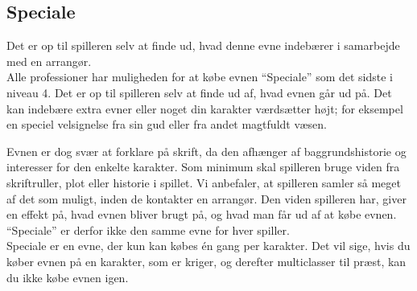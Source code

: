 \subsection{Speciale}

Det er op til spilleren selv at finde ud, hvad denne evne indebærer i samarbejde med en arrangør.\\

Alle professioner har muligheden for at købe evnen “Speciale” som det sidste i niveau 4. Det er op til spilleren selv at finde ud af, hvad evnen går ud på. Det kan indebære extra evner eller noget din karakter værdsætter højt; for eksempel en speciel velsignelse fra sin gud eller fra andet magtfuldt væsen.

Evnen er dog svær at forklare på skrift, da den afhænger af baggrundshistorie og interesser for den enkelte karakter. Som minimum skal spilleren bruge viden fra skriftruller, plot eller historie i spillet. Vi anbefaler, at spilleren samler så meget af det som muligt, inden de kontakter en arrangør. Den viden spilleren har, giver en effekt på, hvad evnen bliver brugt på, og hvad man får ud af at købe evnen. “Speciale” er derfor ikke den samme evne for hver spiller.\\

Speciale er en evne, der kun kan købes én gang per karakter. Det vil sige, hvis du køber evnen på en karakter, som er kriger, og derefter multiclasser til præst, kan du ikke købe evnen igen.
